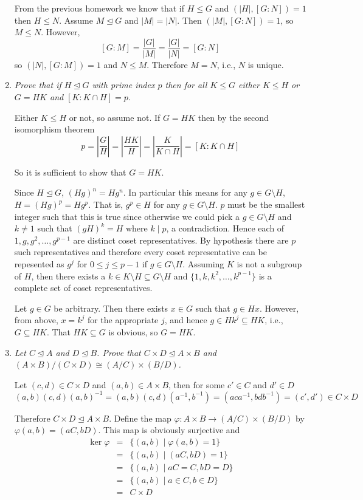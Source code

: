 \documentclass[letterpaper, 11pt]{article}
\begin{document}
\begin{enumerate}
From the previous homework we know that if $H \leq G$ and $(|H|, [G:N])=1$ then $H \leq N$.  Assume $M \unlhd G$ and $|M| = |N|$.  Then $(|M|, [G:N]) = 1$, so $M \leq N$.  However, $$[G:M] = \frac{|G|}{|M|} = \frac{|G|}{|N|} = [G:N]$$ so $(|N|, [G:M]) = 1$ and $N \leq M$.  Therefore $M = N$, i.e., $N$ is unique.

\item \emph{Prove that if $H \unlhd G$ with prime index $p$ then for all $K \leq G$ either $K \leq H$ or $G = HK$ and $[K: K \cap H] = p$.}

Either $K \leq H$ or not, so assume not.  If $G = HK$ then by the second isomorphism theorem
\[
p = \left|\frac{G}{H}\right| =  \left|\frac{HK}{H}\right| = \left|\frac{K}{K \cap H}\right| = [K : K \cap H]
\]

So it is sufficient to show that $G = HK$.  

Since $H \unlhd G$, $(Hg)^n = Hg^n$.  In particular this means for any $g \in G\setminus H$, $H = (Hg)^p = Hg^p$.  That is, $g^p \in H$ for any $g \in G \setminus H$.  $p$ must be the smallest integer such that this is true since otherwise we could pick a $g \in G \setminus H$ and $k \neq 1$ such that $(gH)^k = H$ where $k \mid p$, a contradiction.  Hence each of $1, g, g^2, \ldots, g^{p-1}$ are distinct coset representatives.  By hypothesis there are $p$ such representatives and therefore every coset representative can be repesented as $g^j$ for $0 \leq j \leq p-1$ if $g \in G \setminus H$.  Assuming $K$ is not a subgroup of $H$, then there exists a $k \in K \setminus H \subseteq G \setminus H$ and $\{1, k, k^2, \ldots, k^{p-1}\}$ is a complete set of coset representatives.

Let $g \in G$ be arbitrary.  Then there exists $x \in G$ such that $g \in Hx$.  However, from above, $x = k^j$ for the appropriate $j$, and hence $g \in Hk^j \subseteq HK$, i.e., $G \subseteq HK$.  That $HK \subseteq G$ is obvious, so $G = HK$.


\item \emph{Let $C \unlhd A$ and $D \unlhd B$.  Prove that $C \times D \unlhd A \times B$ and $(A \times B)/(C \times D) \cong (A/C) \times (B/D)$.}

Let $(c,d) \in C \times D$ and $(a,b) \in A \times B$, then for some $c' \in C$ and $d' \in D$
\[
(a,b)(c,d)(a,b)^{-1} = (a,b)(c,d)(a^{-1},b^{-1}) = (aca^{-1}, bdb^{-1}) = (c', d') \in C \times D
\]

Therefore $C \times D \unlhd A \times B$.  Define the map $\varphi: A \times B \rightarrow (A/C) \times (B/D)$ by $\varphi(a,b) = (aC, bD)$.  This map is obviously surjective and
\begin{eqnarray*}
\ker \varphi &=& \{(a,b) \mid \varphi(a,b) = 1 \} \\
&=& \{(a,b) \mid (aC, bD) = 1\} \\
&=& \{(a,b) \mid aC = C, bD = D\} \\
&=& \{(a,b) \mid a \in C, b \in D\} \\
&=& C \times D
\end{eqnarray*}


\end{enumerate}
\end{document}
